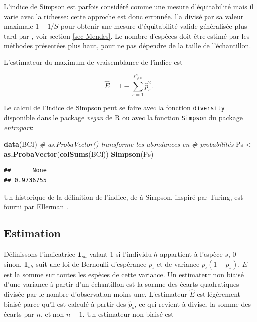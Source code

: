 \documentclass[
  11pt,
  french,
  a4paper,
  extrafontsizes,onecolumn,openright
  ]{memoir}
\newenvironment{Shaded}{\begin{snugshade}}{\end{snugshade}}
\newcommand{\CommentTok}[1]{\textcolor[rgb]{0.56,0.35,0.01}{\textit{#1}}}
\newcommand{\KeywordTok}[1]{\textcolor[rgb]{0.13,0.29,0.53}{\textbf{#1}}}
\newcommand{\NormalTok}[1]{#1}
\newcommand{\StringTok}[1]{\textcolor[rgb]{0.31,0.60,0.02}{#1}}
\newlength{\rf}
\begin{document}
L'indice de Simpson est parfois considéré comme une mesure d'équitabilité \autocite{Olszewski2004} mais il varie avec la richesse: cette approche est donc erronnée.
\textcite{Hurlbert1971} l'a divisé par sa valeur maximale \(1-{1}/{S}\) pour obtenir une mesure d'équitabilité valide généralisée plus tard par \textcite{Mendes2008}, voir section \ref{sec-Mendes}.
Le nombre d'espèces doit être estimé par les méthodes présentées plus haut, pour ne pas dépendre de la taille de l'échantillon.

L'estimateur du maximum de vraisemblance de l'indice est

\begin{equation}
  \label{eq:EstEML}
  \hat{E} = 1-\sum^{s^{n}_{\ne 0}}_{s=1}{\hat{p}^2_s}.
\end{equation}

Le calcul de l'indice de Simpson peut se faire avec la fonction \texttt{diversity} disponible dans le package \emph{vegan} de R ou avec la fonction \texttt{Simpson} du package \emph{entropart}:

\scriptsize

\begin{Shaded}
\begin{Highlighting}[]
\KeywordTok{data}\NormalTok{(BCI)}
\CommentTok{# as.ProbaVector() transforme les abondances en}
\CommentTok{# probabilités}
\NormalTok{Ps <-}\StringTok{ }\KeywordTok{as.ProbaVector}\NormalTok{(}\KeywordTok{colSums}\NormalTok{(BCI))}
\KeywordTok{Simpson}\NormalTok{(Ps)}
\end{Highlighting}
\end{Shaded}

\begin{verbatim}
##      None 
## 0.9736755
\end{verbatim}

\normalsize

Un historique de la définition de l'indice, de \textcite{Gini1912} à Simpson, inspiré par Turing, est fourni par Ellerman \autocite*{Ellerman2013}.

\hypertarget{estimation}{%
\subsection{Estimation}\label{estimation}}

Définissons l'indicatrice \({{\mathbf 1}}_{sh}\) valant 1 si l'individu \(h\) appartient à l'espèce \(s\), 0 sinon.
\({{\mathbf 1}}_{sh}\) suit une loi de Bernoulli d'espérance \(p_s\) et de variance \(p_s\left(1-p_s\right)\).
\(E\) est la somme sur toutes les espèces de cette variance.
Un estimateur non biaisé d'une variance à partir d'un échantillon est la somme des écarts quadratiques divisée par le nombre d'observation moins une.
L'estimateur \(\hat{E}\) est légèrement biaisé parce qu'il est calculé à partir des \({\hat{p}}_s\), ce qui revient à diviser la somme des écarts par \(n\), et non \(n-1\).
Un estimateur non biaisé est \autocite{Good1953,Lande1996}
\end{document}
